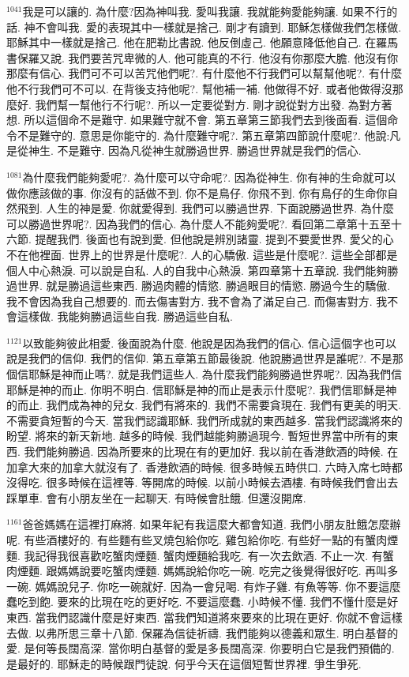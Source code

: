 \documentclass{book}
\begin{document}
$^{1041}$我是可以讓的.
為什麼?因為神叫我.
愛叫我讓.
我就能夠愛能夠讓.
如果不行的話.
神不會叫我.
愛的表現其中一樣就是捨己.
剛才有讀到.
耶穌怎樣做我們怎樣做.
耶穌其中一樣就是捨己.
他在肥勒比書說.
他反倒虛己.
他願意降低他自己.
在羅馬書保羅又說.
我們要苦咒卑微的人.
他可能真的不行.
他沒有你那麼大膽.
他沒有你那麼有信心.
我們可不可以苦咒他們呢?.
有什麼他不行我們可以幫幫他呢?.
有什麼他不行我們可不可以.
在背後支持他呢?.
幫他補一補.
他做得不好.
或者他做得沒那麼好.
我們幫一幫他行不行呢?.
所以一定要從對方.
剛才說從對方出發.
為對方著想.
所以這個命不是難守.
如果難守就不會.
第五章第三節我們去到後面看.
這個命令不是難守的.
意思是你能守的.
為什麼難守呢?.
第五章第四節說什麼呢?.
他說:凡是從神生.
不是難守.
因為凡從神生就勝過世界.
勝過世界就是我們的信心.

$^{1081}$為什麼我們能夠愛呢?.
為什麼可以守命呢?.
因為從神生.
你有神的生命就可以做你應該做的事.
你沒有的話做不到.
你不是鳥仔.
你飛不到.
你有鳥仔的生命你自然飛到.
人生的神是愛.
你就愛得到.
我們可以勝過世界.
下面說勝過世界.
為什麼可以勝過世界呢?.
因為我們的信心.
為什麼人不能夠愛呢?.
看回第二章第十五至十六節.
提醒我們.
後面也有說到愛.
但他說是辨別諸靈.
提到不要愛世界.
愛父的心不在他裡面.
世界上的世界是什麼呢?.
人的心驕傲.
這些是什麼呢?.
這些全部都是個人中心熱淚.
可以說是自私.
人的自我中心熱淚.
第四章第十五章說.
我們能夠勝過世界.
就是勝過這些東西.
勝過肉體的情慾.
勝過眼目的情慾.
勝過今生的驕傲.
我不會因為我自己想要的.
而去傷害對方.
我不會為了滿足自己.
而傷害對方.
我不會這樣做.
我能夠勝過這些自我.
勝過這些自私.

$^{1121}$以致能夠彼此相愛.
後面說為什麼.
他說是因為我們的信心.
信心這個字也可以說是我們的信仰.
我們的信仰.
第五章第五節最後說.
他說勝過世界是誰呢?.
不是那個信耶穌是神而止嗎?.
就是我們這些人.
為什麼我們能夠勝過世界呢?.
因為我們信耶穌是神的而止.
你明不明白.
信耶穌是神的而止是表示什麼呢?.
我們信耶穌是神的而止.
我們成為神的兒女.
我們有將來的.
我們不需要貪現在.
我們有更美的明天.
不需要貪短暫的今天.
當我們認識耶穌.
我們所成就的東西越多.
當我們認識將來的盼望.
將來的新天新地.
越多的時候.
我們越能夠勝過現今.
暫短世界當中所有的東西.
我們能夠勝過.
因為所要來的比現在有的更加好.
我以前在香港飲酒的時候.
在加拿大來的加拿大就沒有了.
香港飲酒的時候.
很多時候五時供口.
六時入席七時都沒得吃.
很多時候在這裡等.
等開席的時候.
以前小時候去酒樓.
有時候我們會出去踩單車.
會有小朋友坐在一起聊天.
有時候會肚餓.
但還沒開席.

$^{1161}$爸爸媽媽在這裡打麻將.
如果年紀有我這麼大都會知道.
我們小朋友肚餓怎麼辦呢.
有些酒樓好的.
有些麵有些叉燒包給你吃.
雞包給你吃.
有些好一點的有蟹肉煙麵.
我記得我很喜歡吃蟹肉煙麵.
蟹肉煙麵給我吃.
有一次去飲酒.
不止一次.
有蟹肉煙麵.
跟媽媽說要吃蟹肉煙麵.
媽媽說給你吃一碗.
吃完之後覺得很好吃.
再叫多一碗.
媽媽說兒子.
你吃一碗就好.
因為一會兒喝.
有炸子雞.
有魚等等.
你不要這麼蠢吃到飽.
要來的比現在吃的更好吃.
不要這麼蠢.
小時候不懂.
我們不懂什麼是好東西.
當我們認識什麼是好東西.
當我們知道將來要來的比現在更好.
你就不會這樣去做.
以弗所思三章十八節.
保羅為信徒祈禱.
我們能夠以德義和眾生.
明白基督的愛.
是何等長闊高深.
當你明白基督的愛是多長闊高深.
你要明白它是我們預備的.
是最好的.
耶穌走的時候跟門徒說.
何乎今天在這個短暫世界裡.
爭生爭死.
\end{document}
